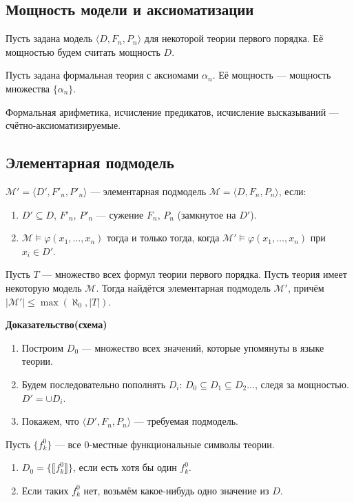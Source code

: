 \subsection{Мощность модели и аксиоматизации}

 Пусть задана модель $\langle D, F_n, P_n \rangle$ для некоторой теории первого порядка. Её мощностью будем считать мощность $D$.


 Пусть задана формальная теория с аксиомами $\alpha_n$. Её мощность --- мощность множества $\{\alpha_n\}$.


Формальная арифметика, исчисление предикатов, исчисление высказываний --- счётно-аксиоматизируемые.


\subsection{Элементарная подмодель}

 $\mathcal{M}' = \langle D', F'_n, P'_n \rangle$ --- элементарная подмодель $\mathcal{M} = \langle D, F_n, P_n \rangle$, если:
\begin{enumerate}
\item $D' \subseteq D$, $F'_n$, $P'_n$ --- сужение $F_n$, $P_n$ (замкнутое на $D'$).
\item $\mathcal{M}\models \varphi(x_1,\dots,x_n)$ тогда и только тогда, когда $\mathcal{M}'\models \varphi(x_1,\dots,x_n)$ при $x_i \in D'$.
\end{enumerate}


Пусть $T$ --- множество всех формул теории первого порядка. Пусть теория имеет некоторую модель $\mathcal{M}$. Тогда найдётся элементарная подмодель $\mathcal{M'}$, причём $|\mathcal{M'}| \leq \max(\aleph_0, |T|)$.

\textbf{Доказательство(схема)}

\begin{enumerate} 
\item Построим $D_0$ --- множество всех значений, которые упомянуты в языке теории.
\item Будем последовательно пополнять $D_i$: $D_0 \subseteq D_1 \subseteq D_2 \dots$, следя за мощностью. $D' = \cup D_i$.
\item Покажем, что $\langle D', F_n, P_n\rangle$ --- требуемая подмодель.
\end{enumerate}


Пусть $\{f^0_k\}$ --- все 0-местные функциональные символы теории.
\begin{enumerate}
\item $D_0 = \{ \llbracket f^0_k \rrbracket \}$, если есть хотя бы один $f^0_k$.
\item Если таких $f^0_k$ нет, возьмём какое-нибудь одно значение из $D$.
\end{enumerate}

